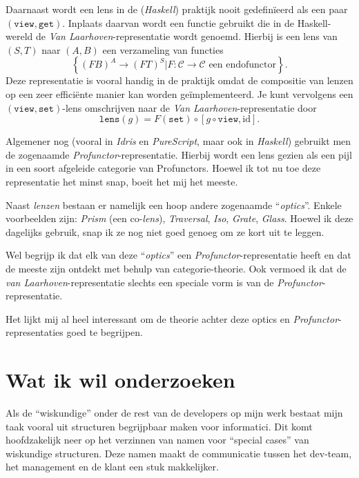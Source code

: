 \documentclass{article}
\newcommand{\id}[0]{\mathrm{id}}
\begin{document}

Daarnaast wordt een lens in de (\emph{Haskell}) praktijk nooit gedefinïeerd als een paar $(\mathtt{view}, \mathtt{get})$. Inplaats daarvan wordt een functie gebruikt die in de Haskell-wereld de \emph{Van Laarhoven}-representatie wordt genoemd. Hierbij is een lens van $(S,T)$ naar $(A,B)$ een verzameling van functies \[
	\left\{ (FB)^A \to (FT)^S| F: \mathcal{C} \to \mathcal{C} \text{ een endofunctor}\right\}.
\]
Deze representatie is vooral handig in de praktijk omdat de compositie van lenzen op een zeer efficiënte manier kan worden geïmplementeerd. Je kunt vervolgens een $(\mathtt{view},\mathtt{set})$-lens omschrijven naar de \emph{Van Laarhoven}-representatie door \[
	\mathtt{lens}(g) = F(\mathtt{set}) \circ [g \circ \mathtt{view}, \id].
\]

\medskip

Algemener nog (vooral in \emph{Idris} en \emph{PureScript}, maar ook in \emph{Haskell}) gebruikt men de zogenaamde \emph{Profunctor}-representatie. Hierbij wordt een lens gezien als een pijl in een soort afgeleide categorie van Profunctors. Hoewel ik tot nu toe deze representatie het minst snap, boeit het mij het meeste.

Naast \emph{lenzen} bestaan er namelijk een hoop andere zogenaamde ``\emph{optics}''. Enkele voorbeelden zijn: \emph{Prism} (een co-\emph{lens}), \emph{Traversal}, \emph{Iso}, \emph{Grate}, \emph{Glass}. Hoewel ik deze dagelijks gebruik, snap ik ze nog niet goed genoeg om ze kort uit te leggen.

Wel begrijp ik dat elk van deze ``\emph{optics}'' een \emph{Profunctor}-representatie heeft en dat de meeste zijn ontdekt met behulp van categorie-theorie. Ook vermoed ik dat de \emph{van Laarhoven}-representatie slechts een speciale vorm is van de \emph{Profunctor}-representatie.

Het lijkt mij al heel interessant om de theorie achter deze optics en \emph{Profunctor}-representaties goed te begrijpen.


\section*{Wat ik wil onderzoeken}

Als de ``wiskundige'' onder de rest van de developers op mijn werk bestaat mijn taak vooral uit structuren begrijpbaar maken voor informatici. Dit komt hoofdzakelijk neer op het verzinnen van namen voor ``special cases'' van wiskundige structuren. Deze namen maakt de communicatie tussen het dev-team, het management en de klant een stuk makkelijker.
\end{document}
